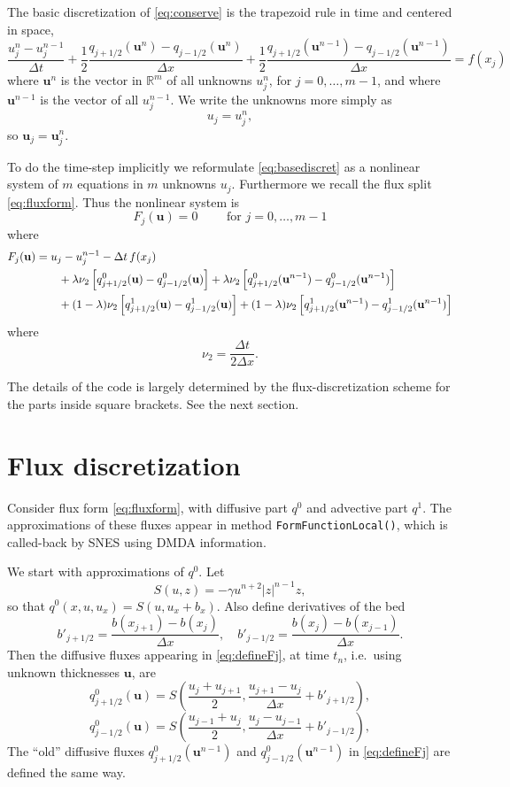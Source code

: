 \documentclass[11pt]{amsart}
\newcommand\bu{\mathbf{u}}
\newcommand\RR{\mathbb{R}}
\begin{document}
The basic discretization of \eqref{eq:conserve} is the trapezoid rule in time and centered in space,
\begin{equation}
\frac{u_j^n - u_j^{n-1}}{\Delta t} + \frac{1}{2} \frac{q_{j+1/2}(\bu^n) - q_{j-1/2}(\bu^n)}{\Delta x} + \frac{1}{2} \frac{q_{j+1/2}(\bu^{n-1}) - q_{j-1/2}(\bu^{n-1})}{\Delta x} = f(x_j) \label{eq:basediscret}
\end{equation}
where $\bu^n$ is the vector in $\RR^m$ of all unknowns $u_j^n$, for $j=0,\dots,m-1$, and where $\bu^{n-1}$ is the vector of all $u_j^{n-1}$.  We write the unknowns more simply as
  $$u_j = u_j^n,$$
so $\bu_j = \bu_j^n$.

To do the time-step implicitly we reformulate \eqref{eq:basediscret} as a nonlinear system of $m$ equations in $m$ unknowns $u_j$.  Furthermore we recall the flux split \eqref{eq:fluxform}.  Thus the nonlinear system is
\begin{equation}
F_j(\bu) = 0 \qquad \text{ for } j = 0,\dots,m-1
\end{equation}
where
\begin{align}
F_j(\bu) &= u_j - u_j^{n-1} - \Delta t\,f(x_j)  \label{eq:defineFj} \\
   &\qquad + \lambda \nu_2 \left[q^0_{j+1/2}(\bu) - q^0_{j-1/2}(\bu)\right] + \lambda \nu_2 \left[q^0_{j+1/2}(\bu^{n-1}) - q^0_{j-1/2}(\bu^{n-1})\right] \notag \\
   &\qquad + (1-\lambda) \nu_2 \left[q^1_{j+1/2}(\bu) -  q^1_{j-1/2}(\bu)\right] + (1-\lambda) \nu_2 \left[q^1_{j+1/2}(\bu^{n-1}) - q^1_{j-1/2}(\bu^{n-1})\right] \notag
\end{align}
where
    $$\nu_2 = \frac{\Delta t}{2\Delta x}.$$

The details of the code is largely determined by the flux-discretization scheme for the parts inside square brackets.  See the next section.

\section{Flux discretization}

Consider flux form \eqref{eq:fluxform}, with diffusive part $q^0$ and advective part $q^1$.  The approximations of these fluxes appear in method \verb|FormFunctionLocal()|, which is called-back by SNES using DMDA information.

We start with approximations of $q^0$.  Let
	$$S(u,z) = - \gamma u^{n+2} |z|^{n-1} z,$$
so that $q^0(x,u,u_x) = S(u,u_x+b_x)$.  Also define derivatives of the bed
	$$b'_{j+1/2} = \frac{b(x_{j+1}) - b(x_j)}{\Delta x}, \quad b'_{j-1/2} = \frac{b(x_j) - b(x_{j-1})}{\Delta x}.$$
Then the diffusive fluxes appearing in \eqref{eq:defineFj}, at time $t_n$, i.e.~using unknown thicknesses $\bu$, are
    $$q^0_{j+1/2}(\bu) = S\left(\frac{u_j+u_{j+1}}{2},\frac{u_{j+1}-u_j}{\Delta x} + b'_{j+1/2}\right),$$
    $$q^0_{j-1/2}(\bu) = S\left(\frac{u_{j-1}+u_j}{2},\frac{u_j-u_{j-1}}{\Delta x} + b'_{j-1/2}\right),$$
The ``old'' diffusive fluxes $q^0_{j+1/2}(\bu^{n-1})$ and $q^0_{j-1/2}(\bu^{n-1})$ in \eqref{eq:defineFj} are defined the same way.
\end{document}
